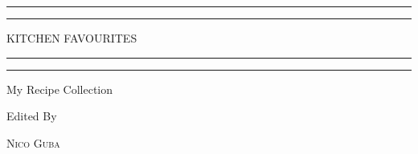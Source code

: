\begin{titlepage} %

	\centering %
	
	\scshape %
	
	\vspace*{\baselineskip} %
	
	
	\rule{\textwidth}{1.6pt}\vspace*{-\baselineskip}\vspace*{2pt} %
	\rule{\textwidth}{0.4pt} %
	
	\vspace{0.75\baselineskip} %
	
	{\LARGE KITCHEN FAVOURITES\\} %
	
	\vspace{0.75\baselineskip} %
	
	\rule{\textwidth}{0.4pt}\vspace*{-\baselineskip}\vspace{3.2pt} %
	\rule{\textwidth}{1.6pt} %
	
	\vspace{2\baselineskip} %
	
	
	My Recipe Collection %
	
	\vspace*{3\baselineskip} %
	
	
	Edited By
	
	\vspace{0.5\baselineskip} %
	
	{\scshape\Large Nico Guba} %
	
	\vspace{0.5\baselineskip} %
	

\end{titlepage}
